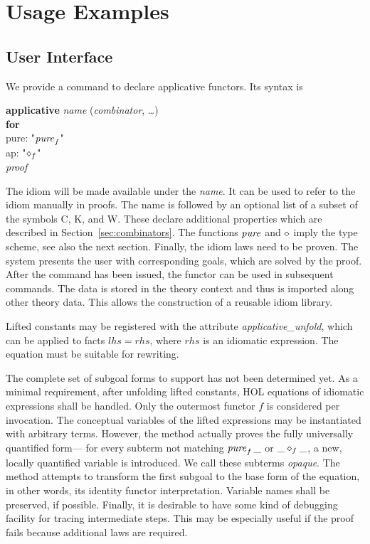 \section{Usage Examples}\label{sec:examples}

\subsection{User Interface}\label{subsec:detail-example}

We provide a command to declare applicative functors.
Its syntax is
\begin{isabelle}
	\textbf{applicative} \textit{name} (\textit{combinator}, \dots) \\
	\textbf{for} \\
	\iindent pure: "$\operatorname{\mathit{pure}}_f$" \\
	\iindent ap: "$\diamond_f$" \\
	\textit{proof}
\end{isabelle}
The idiom will be made available under the \textit{name}.
It can be used to refer to the idiom manually in proofs.
The name is followed by an optional list of a subset of the symbols C, K, and W.
These declare additional properties which are described in Section~\ref{sec:combinators}.
The functions $\operatorname{\mathit{pure}}$ and $\diamond$ imply the type scheme, see also the next
section.
Finally, the idiom laws need to be proven.
The system presents the user with corresponding goals, which are solved by the
proof.
After the command has been issued, the functor can be used in subsequent
commands.
The data is stored in the theory context and thus is imported along other
theory data.
This allows the construction of a reusable idiom library.

Lifted constants may be registered with the attribute \emph{applicative\_unfold},
which can be applied to facts $\mathit{lhs} = \mathit{rhs}$, where $\mathit{rhs}$
is an idiomatic expression.
The equation must be suitable for rewriting.

The complete set of subgoal forms to support has not been determined yet.
\todo{}
As a minimal requirement, after unfolding lifted constants, HOL equations of
idiomatic expressions shall be handled.
Only the outermost functor $f$ is considered per invocation.
The conceptual variables of the lifted expressions may be instantiated with
arbitrary terms.
However, the method actually proves the fully universally quantified form---%
for every subterm not matching $\operatorname{\mathit{pure}}_f{\_}$ or $\_ \diamond_f \_$, a new, locally
quantified variable is introduced.
We call these subterms \emph{opaque}.
The method attempts to transform the first subgoal to the base form of the
equation, in other words, its identity functor interpretation.
Variable names shall be preserved, if possible.
Finally, it is desirable to have some kind of debugging facility for tracing
intermediate steps.
This may be especially useful if the proof fails because additional laws are
required.

